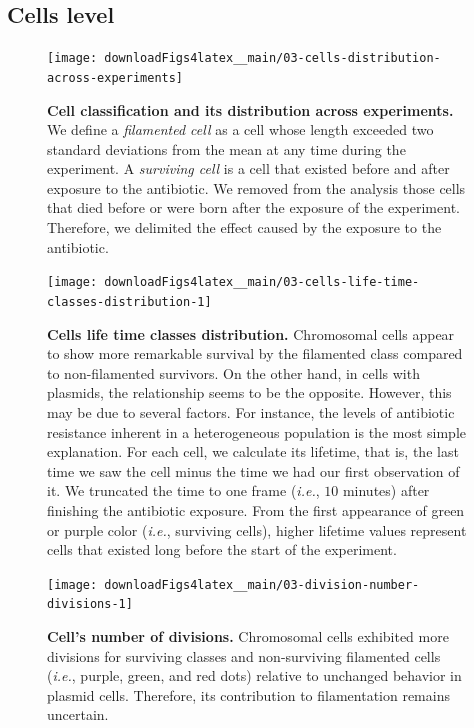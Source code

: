 \documentclass[a4paper, nobind]{templates/ociamthesis}
\begin{document}
\hypertarget{cells-level}{%
\subsection{Cells level}\label{cells-level}}





\begin{figure}[H]
\texttt{[image: downloadFigs4latex\_\_main/03-cells-distribution-across-experiments]} \caption[Cell classification and its distribution across experiments.]{\textbf{Cell classification and its distribution across experiments.} We define a \emph{filamented cell} as a cell whose length exceeded two standard deviations from the mean at any time during the experiment. A \emph{surviving cell} is a cell that existed before and after exposure to the antibiotic. We removed from the analysis those cells that died before or were born after the exposure of the experiment. Therefore, we delimited the effect caused by the exposure to the antibiotic.}\label{fig:03-cells-distribution-across-experiments}
\end{figure}





\begin{figure}[H]
\texttt{[image: downloadFigs4latex\_\_main/03-cells-life-time-classes-distribution-1]} \caption[Cells life time classes distribution.]{\textbf{Cells life time classes distribution.} Chromosomal cells appear to show more remarkable survival by the filamented class compared to non-filamented survivors. On the other hand, in cells with plasmids, the relationship seems to be the opposite. However, this may be due to several factors. For instance, the levels of antibiotic resistance inherent in a heterogeneous population is the most simple explanation. For each cell, we calculate its lifetime, that is, the last time we saw the cell minus the time we had our first observation of it. We truncated the time to one frame (\emph{i.e.}, \(10\) minutes) after finishing the antibiotic exposure. From the first appearance of green or purple color (\emph{i.e.}, surviving cells), higher lifetime values represent cells that existed long before the start of the experiment.}\label{fig:03-cells-life-time-classes-distribution-1}
\end{figure}





\begin{figure}[H]
\texttt{[image: downloadFigs4latex\_\_main/03-division-number-divisions-1]} \caption[Cell's number of divisions.]{\textbf{Cell's number of divisions.} Chromosomal cells exhibited more divisions for surviving classes and non-surviving filamented cells (\emph{i.e.}, purple, green, and red dots) relative to unchanged behavior in plasmid cells. Therefore, its contribution to filamentation remains uncertain.}\label{fig:03-division-number-divisions-1}
\end{figure}
\end{document}
